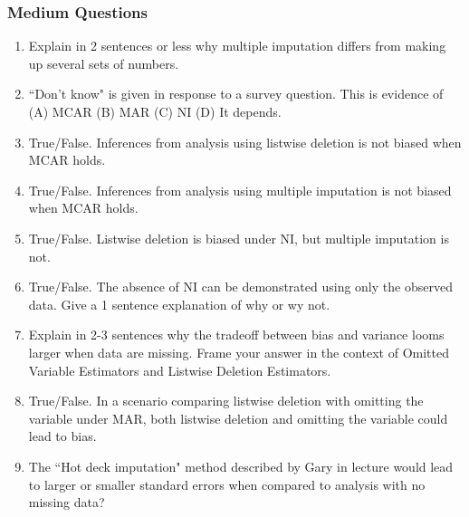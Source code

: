 \documentclass[11pt]{article}
\begin{document}
\subsubsection{Medium Questions}
\begin{enumerate}
\item Explain in 2 sentences or less why multiple imputation differs from making up several sets of numbers.
\item ``Don't know" is given in response to a survey question. This is evidence of (A) MCAR (B) MAR (C) NI (D) It depends. %
\item True/False. Inferences from analysis using listwise deletion is not biased when MCAR holds.
\item True/False. Inferences from analysis using multiple imputation is not biased when MCAR holds.
\item True/False. Listwise deletion is biased under NI, but multiple imputation is not.
\item True/False. The absence of NI can be demonstrated using only the observed data. Give a 1 sentence explanation of why or wy not.
\item Explain in 2-3 sentences why the tradeoff between bias and variance looms larger when data are missing. Frame your answer in the context of Omitted Variable Estimators and Listwise Deletion Estimators.
\item True/False. In a scenario comparing listwise deletion with omitting the variable under MAR, both listwise deletion and omitting the variable could lead to bias.
\item The ``Hot deck imputation" method described by Gary in lecture would lead to larger or smaller standard errors when compared to analysis with no missing data?
\end{enumerate}
\end{document}
